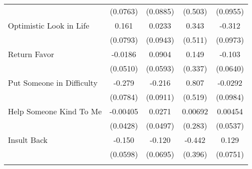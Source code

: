 {\begin{tabular}{l*{4}{c}}
            &    (0.0763)         &    (0.0885)         &     (0.503)         &    (0.0955)         \\
[1em]
Optimistic Look in Life&       0.161\sym{*}  &      0.0233         &       0.343         &      -0.312\sym{**} \\
            &    (0.0793)         &    (0.0943)         &     (0.511)         &    (0.0973)         \\
[1em]
Return Favor&     -0.0186         &      0.0904         &       0.149         &      -0.103         \\
            &    (0.0510)         &    (0.0593)         &     (0.337)         &    (0.0640)         \\
[1em]
Put Someone in Difficulty&      -0.279\sym{***}&      -0.216\sym{*}  &       0.807         &     -0.0292         \\
            &    (0.0784)         &    (0.0911)         &     (0.519)         &    (0.0984)         \\
[1em]
Help Someone Kind To Me&    -0.00405         &      0.0271         &     0.00692         &     0.00454         \\
            &    (0.0428)         &    (0.0497)         &     (0.283)         &    (0.0537)         \\
[1em]
Insult Back &      -0.150\sym{*}  &      -0.120         &      -0.442         &       0.129         \\
            &    (0.0598)         &    (0.0695)         &     (0.396)         &    (0.0751)         \\
\hline\hline
{}\\
\end{tabular}
}
